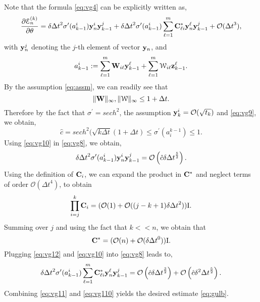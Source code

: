 \documentclass{article} \usepackage{iclr2021_conference,times}
\newcommand{\cW}{\EuScript{W}}
\newcommand{\by}{{\bf y}}
\newcommand{\bz}{{\bf z}}
\newcommand{\bW}{{\bf W}}
\newcommand{\bC}{{\bf C}}
\newcommand{\ord}{{\mathcal O}}
\newcommand{\Dt}{{\Delta t}}
\newcommand{\E}{\EuScript{E}}
\newcommand{\ind}{\mathrm{I}}
\begin{document}
Note that the formula \eqref{eq:vg4} can be explicitly written as,
\begin{equation}
    \label{eq:vg8}
    \frac{\partial \E^{(k)}_n}{\partial \theta} = \delta \Dt^2 \sigma^{\prime}(a_{k-1}^i) \by^i_n \by^j_{k-1} +  \delta \Dt^2 \sigma^{\prime}(a_{k-1}^i) \sum\limits_{\ell=1}^m \bC^{\ast}_{\ell i}\by^\ell_n \by^j_{k-1}  + \ord(\Dt^3),
\end{equation}
with $\by^j_n$ denoting the $j$-th element of vector $\by_n$, and
\begin{equation}
    \label{eq:vg9}
    a_{k-1}^i:= \sum\limits_{\ell=1}^m \bW_{i\ell}\by^\ell_{k-1} + \sum\limits_{\ell=1}^m \cW_{i\ell}\bz^\ell_{k-1}. 
\end{equation}
By the assumption \eqref{eq:assm}, we can readily see that 
$$
\|\bW\|_{\infty},\|\cW\|_{\infty} \leq 1 + \Dt.
$$
Therefore by the fact that $\sigma^{\prime} = sech^2$, the assumption $\by_k^i = \ord(\sqrt{t_k})$ and \eqref{eq:vg9}, we obtain,
\begin{equation}
    \label{eq:vg10}
    \hat{c} = sech^2(\sqrt{k\Dt}(1+\Dt) \leq \sigma^{\prime}(a^{k-1}_i) \leq 1.
    \end{equation}
Using \eqref{eq:vg10} in \eqref{eq:vg8}, we obtain,
\begin{equation}
    \label{eq:vg11}
    \delta \Dt^2 \sigma^{\prime}(a_{k-1}^i) \by^i_n \by^j_{k-1} = \ord\left(\hat{c}\delta \Dt^{\frac{5}{2}}\right).
\end{equation}
Using the definition of $\bC_i$, we can expand the product in $\bC^{\ast}$ and neglect terms of order $\ord(\Dt^4)$, to obtain
$$
\prod\limits_{i=j}^k \bC_i = (\ord(1) + \ord((j-k+1)\delta \Dt^{2})) \ind.
$$
Summing over $j$ and using the fact that $k << n$, we obtain that
\begin{equation}
    \label{eq:vg12}
    \bC^{\ast} = (\ord(n) + \ord(\delta \Dt^0)) \ind.
\end{equation}
Plugging \eqref{eq:vg12} and \eqref{eq:vg10} into \eqref{eq:vg8} leads to,
\begin{equation}
    \label{eq:vg110}
\delta \Dt^2 \sigma^{\prime}(a_{k-1}^i) \sum\limits_{\ell=1}^m \bC^{\ast}_{\ell i}\by^\ell_n \by^j_{k-1} = \ord\left(\hat{c}\delta \Dt^{\frac{3}{2}}\right) + \ord\left(\hat{c}\delta^2 \Dt^{\frac{5}{2}}\right).
\end{equation}
Combining \eqref{eq:vg11} and \eqref{eq:vg110} yields the desired estimate \eqref{eq:gulb}.
\end{document}
